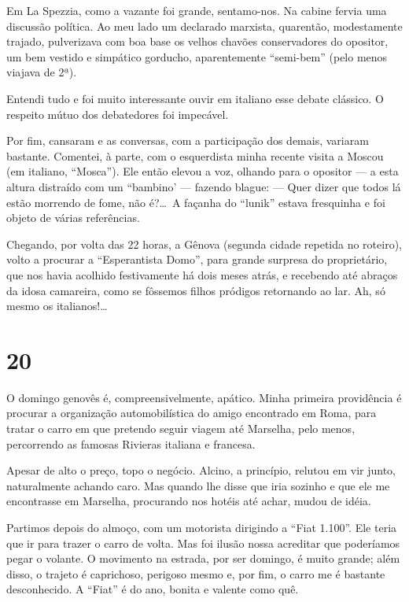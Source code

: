 Em La Spezzia, como a vazante foi grande, sentamo-nos. Na cabine fervia uma discussão política. Ao meu lado um declarado marxista, quarentão, modestamente trajado, pulverizava com boa base os velhos chavões conservadores do opositor, um bem vestido e simpático gorducho, aparentemente ``semi-bem'' (pelo menos viajava de 2ª).

Entendi tudo e foi muito interessante ouvir em italiano esse debate clássico. O respeito mútuo dos debatedores foi impecável.

Por fim, cansaram e as conversas, com a participação dos demais, variaram bastante. Comentei, à parte, com o esquerdista minha recente visita a Moscou (em italiano, ``Mosca''). Ele então elevou a voz, olhando para o opositor --- a esta altura distraído com um ``bambino’ --- fazendo blague: --- Quer dizer que todos lá estão morrendo de fome, não é?\ldots\ A façanha do ``lunik'' estava fresquinha e foi objeto de várias referências.

Chegando, por volta das 22 horas, a Gênova (segunda cidade repetida no roteiro), volto a procurar a ``Esperantista Domo'', para grande surpresa do proprietário, que nos havia acolhido festivamente há dois meses atrás, e recebendo até abraços da idosa camareira, como se fôssemos filhos pródigos retornando ao lar. Ah, só mesmo os italianos!\ldots

\section*{20 \adfflatleafright {}}
O domingo genovês é, compreensivelmente, apático. Minha primeira providência é procurar a organização automobilística do amigo encontrado em Roma, para tratar o carro em que pretendo seguir viagem até Marselha, pelo menos, percorrendo as famosas Rivieras italiana e francesa.

Apesar de alto o preço, topo o negócio. Alcino, a princípio, relutou em vir junto, naturalmente achando caro. Mas quando lhe disse que iria sozinho e que ele me encontrasse em Marselha, procurando nos hotéis até achar, mudou de idéia.

Partimos depois do almoço, com um motorista dirigindo a ``Fiat 1.100''. Ele teria que ir para trazer o carro de volta. Mas foi ilusão nossa acreditar que poderíamos pegar o volante. O movimento na estrada, por ser domingo, é muito grande; além disso, o trajeto é caprichoso, perigoso mesmo e, por fim, o carro me é bastante desconhecido. A ``Fiat'' é do ano, bonita e valente como quê.

